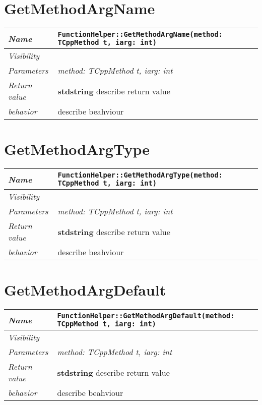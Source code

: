  \section{GetMethodArgName}
\begin{longtable}{p{3cm} @{\hskip 1cm} p{12cm}}
 \hline
\textit{Name} & \texttt{FunctionHelper::GetMethodArgName(method: TCppMethod t, iarg: int)}\\
\hline
 \textit{Visibility} & \\
\hline
\textit{Parameters} & \textit{method: TCppMethod t, iarg: int}\\
\hline
\textit{Return value} & \textbf{ stdstring} describe return value\\
  \hline
 \textit{behavior} & describe beahviour \\
\hline
\end{longtable} \pagebreak
 \section{GetMethodArgType}
\begin{longtable}{p{3cm} @{\hskip 1cm} p{12cm}}
 \hline
\textit{Name} & \texttt{FunctionHelper::GetMethodArgType(method: TCppMethod t, iarg: int)}\\
\hline
 \textit{Visibility} & \\
\hline
\textit{Parameters} & \textit{method: TCppMethod t, iarg: int}\\
\hline
\textit{Return value} & \textbf{ stdstring} describe return value\\
  \hline
 \textit{behavior} & describe beahviour \\
\hline
\end{longtable} \pagebreak
 \section{GetMethodArgDefault}
\begin{longtable}{p{3cm} @{\hskip 1cm} p{12cm}}
 \hline
\textit{Name} & \texttt{FunctionHelper::GetMethodArgDefault(method: TCppMethod t, iarg: int)}\\
\hline
 \textit{Visibility} & \\
\hline
\textit{Parameters} & \textit{method: TCppMethod t, iarg: int}\\
\hline
\textit{Return value} & \textbf{ stdstring} describe return value\\
  \hline
 \textit{behavior} & describe beahviour \\
\hline
\end{longtable} \pagebreak
